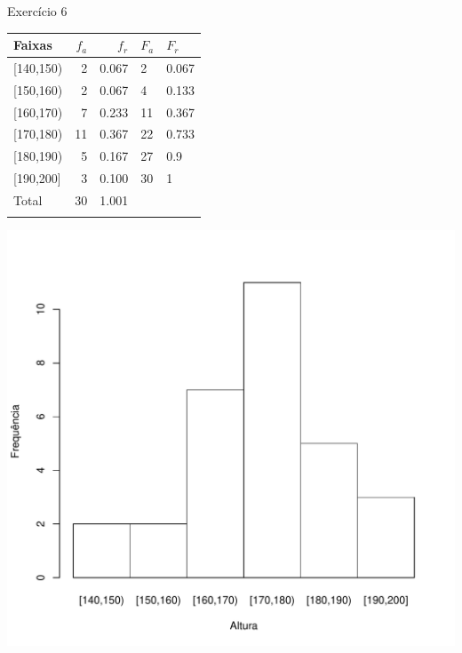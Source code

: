 \documentclass[
  ignorenonframetext,
  serif,
  professionalfont,
  usenames,
  dvipsnames,
  aspectratio = 169]{beamer}
\def\beginAHalfColumn{\begin{minipage}{0.49\textwidth}}%
\def\endColumns{\end{minipage}}%
\begin{document}
\begin{frame}{Exercício 6}
\label{exercuxedcio-6-2}
\beginAHalfColumn

\begin{longtable}[]{@{}lrrll@{}}
\toprule\noalign{}
Faixas & \(f_a\) & \(f_r\) & \(F_{a}\) & \(F_{r}\) \\
\midrule\noalign{}
\endhead
{[}140,150) & 2 & 0.067 & 2 & 0.067 \\
{[}150,160) & 2 & 0.067 & 4 & 0.133 \\
{[}160,170) & 7 & 0.233 & 11 & 0.367 \\
{[}170,180) & 11 & 0.367 & 22 & 0.733 \\
{[}180,190) & 5 & 0.167 & 27 & 0.9 \\
{[}190,200{]} & 3 & 0.100 & 30 & 1 \\
Total & 30 & 1.001 & & \\
\bottomrule\noalign{}
\end{longtable}

\endColumns
\beginAHalfColumn

\begin{center}\includegraphics[width=0.9\linewidth]{exercicios-encontro1-solucao_files/figure-beamer/unnamed-chunk-19-1} \end{center}

\endColumns
\end{frame}
\end{document}
